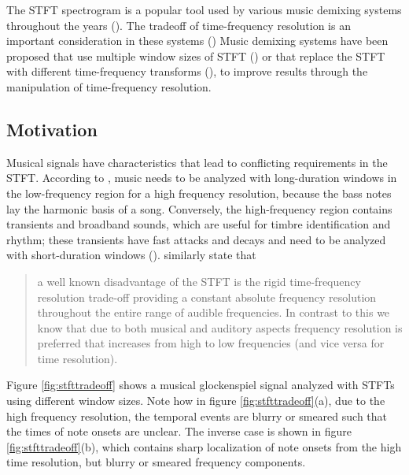 \documentclass[report.tex]{subfiles}
\begin{document}
The STFT spectrogram is a popular tool used by various music demixing systems throughout the years (\cite{musicsepgood, musicmask, sisec2018, fitzgerald1, umx, plumbley1, plumbley2}). The tradeoff of time-frequency resolution is an important consideration in these systems (\cite{tftradeoff1, tftradeoff2}) Music demixing systems have been proposed that use multiple window sizes of STFT (\cite{fitzgerald2, driedger}) or that replace the STFT with different time-frequency transforms (\cite{fitzgerald2, cqtseparation, bettermusicsep}), to improve results through the manipulation of time-frequency resolution.

\subsection{Motivation}
\label{sec:motivation}

Musical signals have characteristics that lead to conflicting requirements in the STFT. According to \textcite{doerflerphd}, music needs to be analyzed with long-duration windows in the low-frequency region for a high frequency resolution, because the bass notes lay the harmonic basis of a song. Conversely, the high-frequency region contains transients and broadband sounds, which are useful for timbre identification and rhythm; these transients have fast attacks and decays and need to be analyzed with short-duration windows (\cite{doerflerphd}). \textcite[1]{cqtransient} similarly state that

\begin{quote}
	a well known disadvantage of the STFT is the rigid time-frequency resolution trade-off providing a constant absolute frequency resolution throughout the entire range of audible frequencies. In contrast to this we know that due to both musical and auditory aspects frequency resolution is preferred that increases from high to low frequencies (and vice versa for time resolution).
\end{quote}

Figure \ref{fig:stfttradeoff} shows a musical glockenspiel signal analyzed with STFTs using different window sizes. Note how in figure \ref{fig:stfttradeoff}(a), due to the high frequency resolution, the temporal events are blurry or smeared such that the times of note onsets are unclear. The inverse case is shown in figure \ref{fig:stfttradeoff}(b), which contains sharp localization of note onsets from the high time resolution, but blurry or smeared frequency components.
\end{document}

